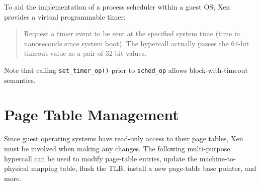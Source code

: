 \documentclass[11pt,twoside,final,openright]{report}
\begin{document}
To aid the implementation of a process scheduler within a guest OS,
Xen provides a virtual programmable timer:

\begin{quote}

Request a timer event to be sent at the specified system time (time 
in nanoseconds since system boot). The hypercall actually passes the 
64-bit timeout value as a pair of 32-bit values. 

\end{quote} 

Note that calling {\tt set\_timer\_op()} prior to {\tt sched\_op} 
allows block-with-timeout semantics. 


\section{Page Table Management} 

Since guest operating systems have read-only access to their page 
tables, Xen must be involved when making any changes. The following
multi-purpose hypercall can be used to modify page-table entries, 
update the machine-to-physical mapping table, flush the TLB, install 
a new page-table base pointer, and more.
\end{document}
